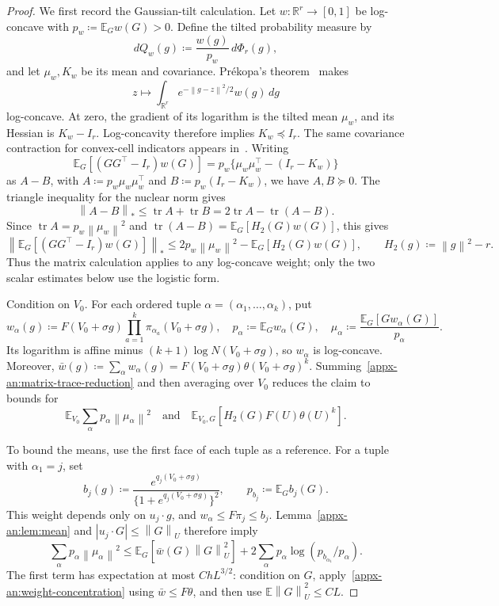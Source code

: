 \documentclass[11pt,letterpaper]{article}
\theoremstyle{remark}
\newcommand{\E}{\mathbb E}
\newcommand{\R}{\mathbb R}
\newcommand{\tr}{\operatorname{tr}}
\newcommand{\norm}[1]{\left\lVert#1\right\rVert}
\newcommand{\dd}{\,d}
\begin{document}
\begin{proof}
We first record the Gaussian-tilt calculation. Let \(w:\R^r\to[0,1]\)
be log-concave with \(p_w\coloneqq \E_Gw(G)>0\). Define the tilted
probability measure by
\[
 dQ_w(g)\coloneqq\frac{w(g)}{p_w}\,d\Phi_r(g),
\]
and let \(\mu_w,K_w\) be its mean and covariance. Pr\'ekopa's
theorem~\cite[Theorem~6]{Prekopa1973} makes
\[
 z\longmapsto\int_{\R^r}e^{-\norm{g-z}^2/2}w(g)\dd g
\]
log-concave. At zero, the gradient of its logarithm is the tilted
mean \(\mu_w\), and its Hessian is \(K_w-I_r\).
Log-concavity therefore implies \(K_w\preceq I_r\). The same covariance contraction for convex-cell
indicators appears in~\cite[Lemma~11]{GaoZhang}.
Writing
\[
 \E_G[(GG^\top-I_r)w(G)]
 =p_w\{\mu_w\mu_w^\top-(I_r-K_w)\}
\]
as \(A-B\), with \(A\coloneqq p_w\mu_w\mu_w^\top\) and
\(B\coloneqq p_w(I_r-K_w)\), we have \(A,B\succeq0\). The triangle
inequality for the nuclear norm gives
\[
 \norm{A-B}_*\le\tr A+\tr B
 =2\tr A-\tr(A-B).
\]
Since \(\tr A=p_w\norm{\mu_w}^2\) and
\(\tr(A-B)=\E_G[H_2(G)w(G)]\), this gives
\begin{equation}
 \left\|\E_G[(GG^\top-I_r)w(G)]\right\|_*
 \le2p_w\norm{\mu_w}^2-\E_G[H_2(G)w(G)],
 \qquad H_2(g)\coloneqq \norm g^2-r.
 \label{appx-an:matrix-trace-reduction}
\end{equation}
Thus the matrix calculation applies to any log-concave weight; only
the two scalar estimates below use the logistic form.

Condition on \(V_0\). For each ordered tuple
\(\alpha=(\alpha_1,\ldots,\alpha_k)\), put
\[
 w_\alpha(g)\coloneqq F(V_0+\sigma g)
                 \prod_{a=1}^k\pi_{\alpha_a}(V_0+\sigma g),
 \quad p_\alpha\coloneqq \E_Gw_\alpha(G),
 \quad \mu_\alpha\coloneqq \frac{\E_G[Gw_\alpha(G)]}{p_\alpha}.
\]
Its logarithm is affine minus \((k+1)\log N(V_0+\sigma g)\), so
\(w_\alpha\) is log-concave. Moreover,
\(\bar w(g)\coloneqq \sum_\alpha w_\alpha(g)
=F(V_0+\sigma g)\theta(V_0+\sigma g)^k\).
Summing~\eqref{appx-an:matrix-trace-reduction} and then averaging over
\(V_0\) reduces the claim to bounds for
\[
 \E_{V_0}\sum_\alpha p_\alpha\norm{\mu_\alpha}^2
 \quad\text{and}\quad
 \E_{V_0,G}[H_2(G)F(U)\theta(U)^k].
\]

To bound the means, use the first face of each tuple as a reference.
For a tuple with \(\alpha_1=j\), set
\[
 b_j(g)\coloneqq \frac{e^{q_j(V_0+\sigma g)}}
                  {\{1+e^{q_j(V_0+\sigma g)}\}^2},
 \qquad p_{b_j}\coloneqq \E_Gb_j(G).
\]
This weight depends only on \(u_j\cdot g\), and
\(w_\alpha\le F\pi_j\le b_j\). Lemma~\ref{appx-an:lem:mean}
and \(|u_j\cdot G|\le\norm G_U\) therefore imply
\begin{equation}
 \sum_\alpha p_\alpha\norm{\mu_\alpha}^2
 \le\E_G[\bar w(G)\norm G_U^2]
       +2\sum_\alpha p_\alpha\log(p_{b_{\alpha_1}}/p_\alpha).
 \label{appx-an:entropy-sum}
\end{equation}
The first term has expectation at most \(ChL^{3/2}\): condition on
\(G\), apply~\eqref{appx-an:weight-concentration} using
\(\bar w\le F\theta\), and then use \(\E\norm G_U^2\le CL\).


\end{proof}
\end{document}
